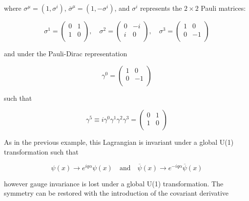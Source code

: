 \documentclass[12pt,a4paper,epsf,portrait,times,epsfig]{report}
\begin{document}
	where $\sigma^{\mu}=(1,\sigma^{i})$, $\overline{\sigma}^{\mu}=(1,-\sigma^{i})$, and $\sigma^{i}$ represents the $2 \times 2$ Pauli matrices:

	\begin{equation}
		\sigma^{1}=\begin{pmatrix}
			0 & 1 \\
			1 & 0 \\
		\end{pmatrix},\quad\sigma^{2}=\begin{pmatrix}
			0 & -i \\
			i & 0 \\
		\end{pmatrix},\quad\sigma^{3}=\begin{pmatrix}
			1 & 0 \\
			0 & -1 \\
		\end{pmatrix}
	\end{equation}

	and under the Pauli-Dirac representation

	\begin{equation}
		\gamma^{0}=\begin{pmatrix}
			1 & 0 \\
			0 & -1 \\
		\end{pmatrix}
	\end{equation}

	such that

	\begin{equation}
		\gamma^{5} \equiv i\gamma^{0}\gamma^{1}\gamma^{2}\gamma^{3}=\begin{pmatrix}
			0 & 1 \\
			1 & 0 \\
		\end{pmatrix} 
	\end{equation}

	As in the previous example, this Lagrangian is invariant under a global U(1) transformation such that

	\begin{equation}
		\psi(x) \rightarrow e^{iq\alpha}\psi(x)  
		\quad\mathrm{and}\quad
		\overline{\psi}(x) \rightarrow e^{-iq\alpha}\overline{\psi}(x)
	\end{equation}

	however gauge invariance is lost under a global U(1) transformation. The symmetry can be restored with the introduction of the covariant derivative 
	
\end{document}
